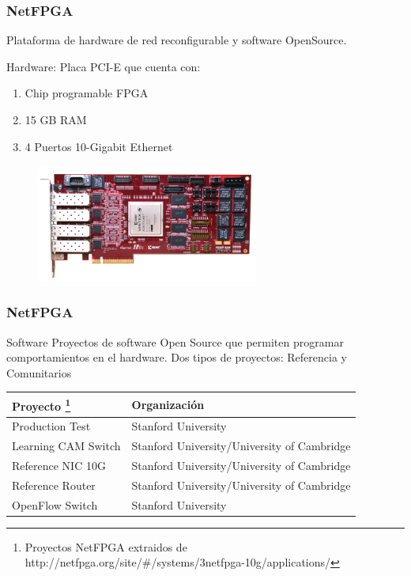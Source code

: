 \documentclass{beamer}
\begin{document}
\begin{frame}
\frametitle{NetFPGA} 


	Plataforma de hardware de red reconfigurable y software OpenSource.



		Hardware: Placa PCI-E que cuenta con: 
		\begin{enumerate}
			\item Chip programable FPGA 
			\item 15 GB RAM
			\item 4 Puertos 10-Gigabit Ethernet
		\end{enumerate}
		
	\begin{figure}[H]
		\includegraphics[width=0.65\textwidth, right]{imagenes/NetFPGA10G_web.jpg}
	\end{figure}


\end{frame}


\begin{frame}
\frametitle{NetFPGA} 
\begin{block}{Software}
Proyectos de software Open Source que permiten programar comportamientos en el hardware. Dos tipos de proyectos: Referencia y Comunitarios

\end{block}

\begin{table}[]
\small
\centering
\label{label}
\begin{tabular}{| p{3.7cm} | p{6.8cm} |}

\hline
\multicolumn{1}{|l|}{Proyecto \footnote[frame]{\tiny Proyectos NetFPGA extraidos de http://netfpga.org/site/\#/systems/3netfpga-10g/applications/}} & \multicolumn{1}{l|}{Organizaci\'on}\\
\hline
Production Test  & Stanford University \\
Learning CAM Switch &  Stanford University/University of Cambridge \\
Reference NIC 10G  &  Stanford University/University of Cambridge  \\
Reference Router  &  Stanford University/University of Cambridge  \\
\hline
OpenFlow Switch & Stanford University  \\
\hline  
\end{tabular}
\end{table}


\end{frame}
\end{document}
